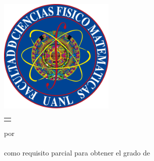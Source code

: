 \documentclass{sty/uanl}
\begin{document}
\newpage
\thispagestyle{empty}

\begin{scshape}
\begin{center}
	{\Large\uanl} \\[5mm]
	{\large\fcfm} \\[5mm]
	{\large\pifi}
	\vskip16mm
	\includegraphics[height=55mm]{Figuras/fcfm.png}
	\vskip16mm
	\begin{tabular}{p{11cm}}
		\centering
		{\large \titulo}
	\end{tabular}
	\vskip7mm
	{por}\\[7mm]
	{\large \autor}\\[7mm]
	{como requisito parcial para obtener el grado de}\\[3mm]
	\MakeUppercase{\grado}\\
	\orientacion
	\vfill
	\fecha
\end{center}
\end{scshape}

\newpage
\thispagestyle{empty}
\enlargethispage{5mm}
\end{document}
